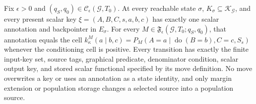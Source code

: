 Fix \(\epsilon>0\) and \((q_S,q_0)\in\mathcal C_{\epsilon}(\mathcal G,T_0)\). At every reachable state \(\sigma\), \(K_\sigma\subseteq\mathscr K_{\mathcal G}\), and every present scalar key \(\xi=(A,B,C,s,a,b,c)\) has exactly one scalar annotation and backpointer in \(E_\sigma\). For every \(M\in\mathfrak F_{\epsilon}(\mathcal G,T_0;q_S,q_0)\), that annotation equals the cell \(k_\kappa^M(a\mid b,c)=P_M(A=a\mid\operatorname{do}(B=b),C=c,S_s)\) whenever the conditioning cell is positive. Every transition has exactly the finite input-key set, source tags, graphical predicate, denominator condition, scalar output key, and stored scalar functional specified by its move definition. No move overwrites a key or uses an annotation as a state identity, and only margin extension or population storage changes a selected source into a population source.